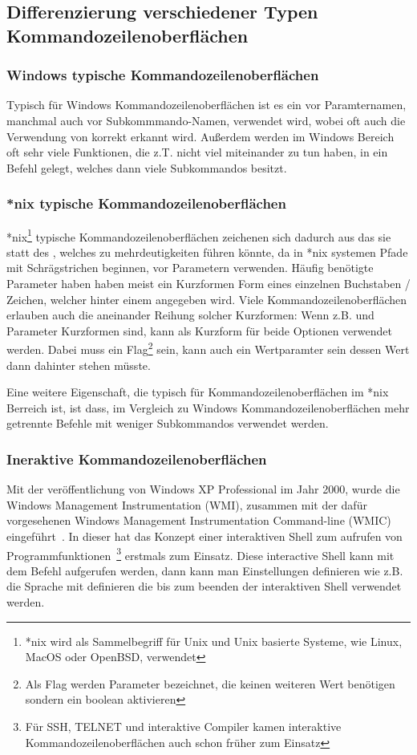  \subsection{Differenzierung verschiedener Typen Kommandozeilenoberflächen}\label{subsec:DifferentCLITypes}
 \subsubsection{Windows typische Kommandozeilenoberflächen}
 Typisch für Windows Kommandozeilenoberflächen ist es ein \inlinecode{/} vor Paramternamen, manchmal auch vor Subkommmando-Namen, verwendet wird, wobei oft auch die Verwendung von \inlinecode{-} korrekt erkannt wird.
 Au\ss erdem werden im Windows Bereich oft sehr viele Funktionen, die z.T. nicht viel miteinander zu tun haben, in ein Befehl gelegt, welches dann viele Subkommandos besitzt.
 \subsubsection{*nix typische Kommandozeilenoberflächen}
 *nix\footnote{*nix wird als Sammelbegriff für Unix und Unix basierte Systeme, wie Linux, MacOS oder OpenBSD, verwendet} typische Kommandozeilenoberflächen
 zeichenen sich dadurch aus das sie statt des \inlinecode{/}, welches zu mehrdeutigkeiten führen könnte, da in *nix systemen Pfade mit Schrägstrichen beginnen, vor Parametern \inlinecode{--} verwenden.
 Häufig benötigte Parameter haben haben meist ein Kurzformen Form eines einzelnen Buchstaben / Zeichen, welcher hinter einem \inlinecode{-} angegeben wird.
 Viele Kommandozeilenoberflächen erlauben auch die aneinander Reihung solcher Kurzformen:
 Wenn z.B.  und  Parameter Kurzformen sind, kann  als Kurzform für beide Optionen verwendet werden.
 Dabei muss  ein Flag\footnote{Als Flag werden Parameter bezeichnet, die keinen weiteren Wert benötigen sondern ein boolean aktivieren} sein,
  kann auch ein Wertparamter sein dessen Wert dann dahinter stehen müsste.
 
 Eine weitere Eigenschaft, die typisch für Kommandozeilenoberflächen im *nix Berreich ist, ist dass,
 im Vergleich zu Windows Kommandozeilenoberflächen mehr getrennte Befehle mit weniger Subkommandos verwendet werden.
 \subsubsection{Ineraktive Kommandozeilenoberflächen}
 Mit der veröffentlichung von Windows XP Professional im Jahr 2000, wurde die Windows Management Instrumentation (WMI),
 zusammen mit der dafür vorgesehenen Windows Management Instrumentation Command-line (WMIC) eingeführt~\cite{WMIProgrammingBlogPost}.
 In dieser hat das Konzept einer interaktiven Shell zum aufrufen von
 Programmfunktionen~\footnote{Für SSH, TELNET und interaktive Compiler kamen interaktive Kommandozeilenoberflächen auch schon früher zum Einsatz} erstmals zum Einsatz.
 Diese interactive Shell kann mit dem  Befehl aufgerufen werden, dann kann man Einstellungen definieren wie
 z.B. die Sprache mit  definieren die bis zum beenden der interaktiven Shell verwendet werden.
 
